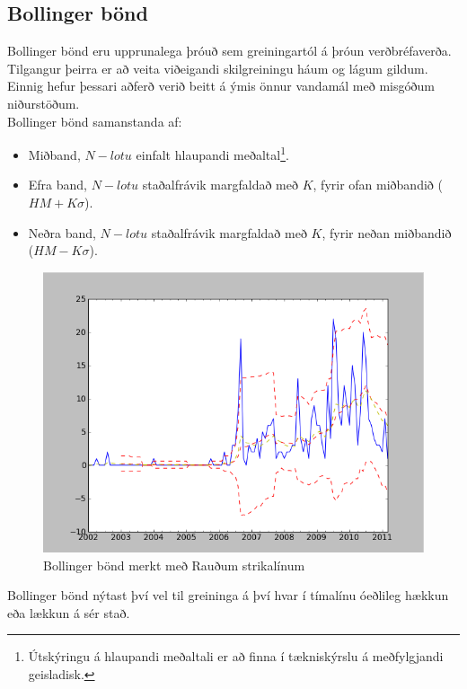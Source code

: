 \documentclass{article}
\begin{document}
\subsection{Bollinger bönd}
\label{sec:research_bollinger_bands}

Bollinger bönd eru upprunalega þróuð sem greiningartól
á þróun verðbréfaverða. 
Tilgangur þeirra er að veita viðeigandi skilgreiningu háum og lágum gildum.
Einnig hefur þessari 
aðferð verið beitt á ýmis önnur vandamál með misgóðum niðurstöðum. \\

Bollinger bönd samanstanda af:




\begin{itemize}
  \item Miðband, $N-lotu$ einfalt hlaupandi meðaltal\footnote[1]{Útskýringu á
hlaupandi meðaltali er að finna í tækniskýrslu á meðfylgjandi geisladisk.}.
  \item Efra band, $N-lotu$ staðalfrávik margfaldað með $K$, fyrir ofan
miðbandið ($HM + K\sigma$).
  \item Neðra band, $N-lotu$ staðalfrávik margfaldað með $K$, fyrir neðan
miðbandið ($HM -K\sigma$).
\end{itemize}







\begin{figure}[H]
  \centering
  \includegraphics[width=.58\textwidth]{Bollinger.png} 
  \caption{Bollinger bönd merkt með Rauðum strikalínum} 
\end{figure}


Bollinger bönd nýtast því vel til greininga á því hvar í
tímalínu óeðlileg hækkun eða lækkun á sér stað.
\end{document}

